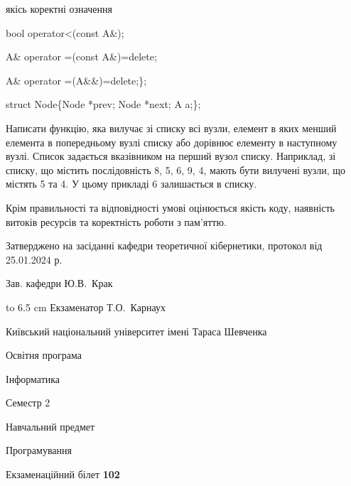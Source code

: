 \documentclass[12pt, ukrainian]{article}
\begin{document}
{\quad  якісь коректні означення 

\quad  bool operator<(const A\&); 

\quad A\& operator =(const A\&)=delete; 

\quad  A\& operator =(A\&\&)=delete;\};

struct Node\{Node *prev; Node *next; A a;\};

Написати функцію, яка вилучає зі списку всі вузли, елемент в яких менший елемента в попередньому вузлі списку або дорівнює елементу в наступному вузлі. Список задається вказівником на перший вузол списку. Наприклад, зі списку, що містить послідовність 8, 5, 6, 9, 4, мають бути вилучені вузли, що містять 5 та 4. У цьому прикладі 6 залишається в списку.

Крім правильності та відповідності умові оцінюється якість коду, наявність витоків ресурсів та коректність роботи з пам'яттю. 

}
{\smallskip\smallskip \begin {scriptsize} Затверджено на засіданні кафедри теоретичної кібернетики, протокол   від   25.01.2024 р.\par\smallskip\smallskip\smallskip\smallskip
{\parbox {6.5 cm} {Зав. кафедри \dotfill Ю.В.~Крак}}\hspace {0.7cm} {\hbox to 6.5 cm { Екзаменатор \dotfill Т.О.~Карнаух}} \end{scriptsize}}
\newpage
{{\begin {scriptsize}\par
{ \center  Київський національний університет імені Тараса Шевченка \par}
{\parbox {5 cm}{Освітня програма \hfill}{\parbox {7 cm}{Інформатика\hfill}}\parbox {6 cm}{\hfill Семестр 2}}\par
{\parbox {5 cm} {Навчальний предмет \hfill}\parbox {7 cm}{Програмування \hfill}\parbox {6cm}{\hfill}\par}\vspace{-15pt} \end{scriptsize}}{\center Екзаменаційний білет \No \textbf { 102 }\par}}
\end{document}

